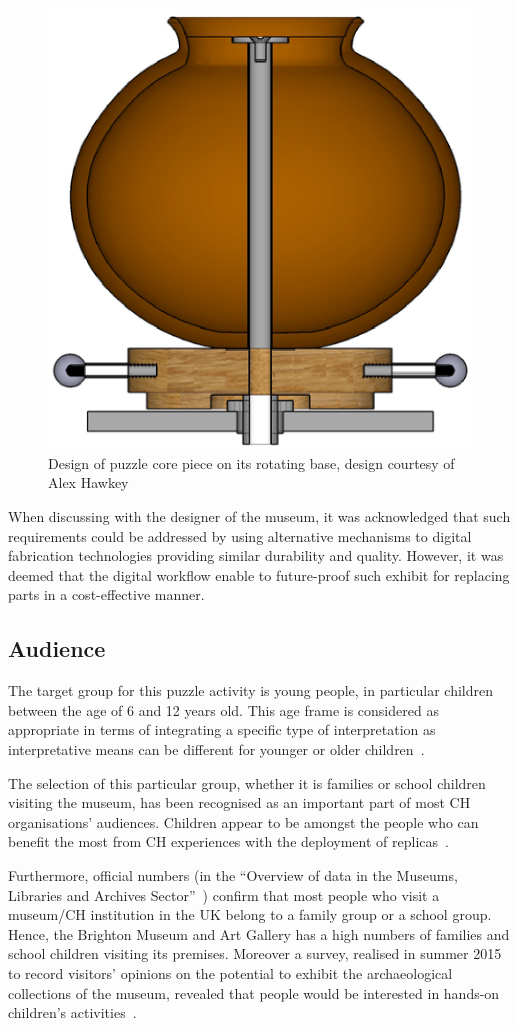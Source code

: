 \documentclass[acmlarge,screen,dvipsnames]{acmart}
\begin{document}
\begin{figure}[H]
  \centering
  \includegraphics[width=0.5\linewidth]{images/alexdesign}
  \caption{\label{fig:alexdesign}%
    Design of puzzle core piece on its rotating base, design courtesy of Alex Hawkey}
\end{figure}

When discussing with the designer of the museum, it was acknowledged
that such requirements could be addressed by using alternative
mechanisms to digital fabrication technologies providing similar
durability and quality. However, it was deemed that the digital
workflow  enable to future-proof such exhibit for replacing parts
in a cost-effective manner.

\subsection{Audience}

The target group for this puzzle activity is young people, in
particular children between the age of 6 and 12 years old. This age
frame is considered as appropriate in terms of integrating a specific
type of interpretation as interpretative means can be different for
younger or older children~\cite{Tilden1977}.

The selection of this particular group, whether it is families or
school children visiting the museum, has been recognised as an
important part of most CH organisations' audiences. Children appear to
be amongst the people who can benefit the most from CH experiences
with the deployment of replicas~\cite{Cabral2013,Neely2015,Miles2015}.

Furthermore, official numbers (in the ``Overview of data in the
Museums, Libraries and Archives Sector''~\cite{Matty2004}) confirm
that most people who visit a museum/CH institution in the UK belong to
a family group or a school group. Hence, the Brighton Museum and Art
Gallery has a high numbers of families and school children visiting
its premises. Moreover a survey, realised in summer 2015 to record
visitors' opinions on the potential to exhibit the archaeological
collections of the museum, revealed that people would be interested in
hands-on children's activities~\cite{RoyalPavilionandMuseums2015}.
\end{document}
